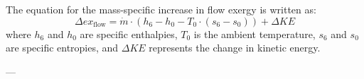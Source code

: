 The equation for the mass-specific increase in flow exergy is written as:  
\[
\Delta ex_{\text{flow}} = \dot{m} \cdot (h_6 - h_0 - T_0 \cdot (s_6 - s_0)) + \Delta KE
\]  
where \(h_6\) and \(h_0\) are specific enthalpies, \(T_0\) is the ambient temperature, \(s_6\) and \(s_0\) are specific entropies, and \(\Delta KE\) represents the change in kinetic energy.

---